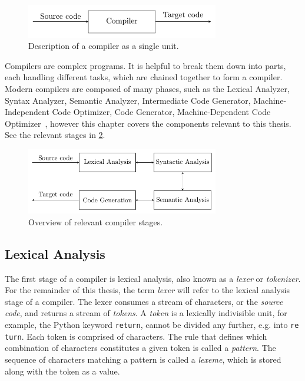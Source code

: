 \begin{figure}[H]\label{fig:compiler}
  \centering
  \includegraphics[width=0.75\textwidth]{figures/compiler.pdf}
  \caption{Description of a compiler as a single unit.}
\end{figure}



Compilers are complex programs. It is helpful to break them down into parts, each handling different tasks, which are chained together to form a compiler. Modern compilers are composed of many phases, such as the Lexical Analyzer, Syntax Analyzer, Semantic Analyzer, Intermediate Code Generator, Machine-Independent Code Optimizer, Code Generator, Machine-Dependent Code Optimizer~\cite[p. 5]{dragon}, however this chapter covers the components relevant to this thesis. See the relevant stages in \cref{fig:compiler-stages}.


\begin{figure}[H]\label{fig:compiler-stages}
  \centering
  \includegraphics[width=0.75\textwidth]{figures/compiler-stages.pdf}
  \caption{Overview of relevant compiler stages.}
\end{figure}

\subsection*{Lexical Analysis}
The first stage of a compiler is lexical analysis, also known as a \emph{lexer} or \emph{tokenizer}. For the remainder of this thesis, the term \emph{lexer} will refer to the lexical analysis stage of a compiler. The lexer consumes a stream of characters, or the \emph{source code}, and returns a stream of \emph{tokens}. A \emph{token} is a lexically indivisible unit, for example, the Python keyword \texttt{return}, cannot be divided any further, e.g. into \texttt{re} \texttt{turn}. Each token is comprised of characters. The rule that defines which combination of characters constitutes a given token is called a \emph{pattern}. The sequence of characters matching a pattern is called a \emph{lexeme}, which is stored along with the token as a value.

